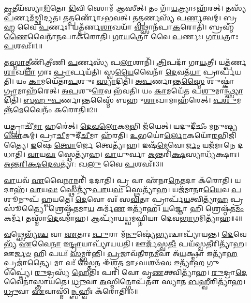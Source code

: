 \setcounter{anuvakam}{0}

\-\ul{𑌤𑍃}\-𑌤𑍀𑌯᳴𑌸𑍍𑌯𑌾\-\ul{𑌮𑌿}\-𑌤𑍋 \ul{𑌦𑌿}\-𑌵𑌿 𑌸𑍋𑌮᳴ 𑌆𑌸𑍀𑌤𑍍।
𑌤𑌂 𑌗𑌾᳴\-\ul{𑌯}\-𑌤𑍍𑌰𑍍𑌯𑌾\-𑌽𑌹᳴𑌰𑌤𑍍।
𑌤𑌸𑍍𑌯᳴ \ul{𑌪}\-𑌰𑍍𑌣𑌮᳴𑌚𑍍𑌛𑌿𑌦𑍍𑌯𑌤।
𑌤\-\ul{𑌤𑍍𑌪}\-𑌰𑍍𑌣𑍋᳴\-𑌽𑌭𑌵𑌤𑍍।
𑌤\-\ul{𑌤𑍍𑌪}\-𑌰𑍍𑌣𑌸𑍍𑌯᳴ 𑌪\-\ul{𑌰𑍍𑌣}\-𑌤𑍍𑌵𑌮𑍍।
𑌬𑍍𑌰\-\ul{𑌹𑍍𑌮} 𑌵𑍈 \ul{𑌪}\-𑌰𑍍𑌣𑌃।
𑌯𑌤𑍍𑌪᳴𑌰𑍍𑌣\-\ul{𑌶𑌾}\-𑌖𑌯𑌾᳴ \ul{𑌵}\-𑌥𑍍𑌸𑌾𑌨᳴𑌪𑌾\-\ul{𑌕}\-𑌰𑍋𑌤𑌿᳴।
𑌬𑍍𑌰𑌹𑍍𑌮᳴\-\ul{𑌣𑍈}\-𑌵𑍈𑌨𑌾᳴\-\ul{𑌨}\-𑌪𑌾𑌕᳴𑌰𑍋𑌤𑌿।
\-\ul{𑌗𑌾}\-\-\ul{𑌯}\-𑌤𑍍𑌰𑍋 𑌵𑍈 \ul{𑌪}\-𑌰𑍍𑌣𑌃।
\-\ul{𑌗𑌾}\-\-\ul{𑌯}\-𑌤𑍍𑌰𑌾𑌃 \ul{𑌪}\-𑌶𑌵𑌃᳴॥1॥

𑌤\-\ul{𑌸𑍍𑌮𑌾}\-𑌤𑍍𑌤𑍍𑌰𑍀𑌣𑌿᳴𑌤𑍍𑌰𑍀𑌣𑌿 \ul{𑌪}\-𑌰𑍍𑌣𑌸𑍍𑌯᳴ 𑌪\-\ul{𑌲𑌾}\-𑌶𑌾𑌨𑌿᳴।
\-\ul{𑌤𑍍𑌰𑌿}\-𑌪𑌦𑌾᳴ 𑌗𑌾\-\ul{𑌯}\-𑌤𑍍𑌰𑍀।
𑌯𑌤𑍍𑌪᳴𑌰𑍍𑌣\-\ul{𑌶𑌾}\-𑌖\-\ul{𑌯𑌾} 𑌗𑌾𑌃 \ul{𑌪𑍍𑌰𑌾}\-𑌰𑍍𑌪𑌯᳴𑌤𑌿।
𑌸𑍍𑌵\-\ul{𑌯𑍈}\-𑌵𑍈𑌨𑌾᳴ \ul{𑌦𑍇}\-𑌵𑌤᳴\-\ul{𑌯𑌾} 𑌪𑍍𑌰𑌾𑌰𑍍𑌪᳴𑌯𑌤𑌿।
𑌯𑌂 \ul{𑌕𑌾}\-𑌮𑌯𑍇᳴𑌤𑌾\-\ul{𑌪}\-𑌶𑍁𑌃 \ul{𑌸𑍍𑌯𑌾}\-𑌦𑌿𑌤𑌿᳴।
\-\ul{𑌅}\-\-\ul{𑌪}\-𑌰𑍍𑌣𑌾𑌨𑍍𑌤\-\ul{𑌸𑍍𑌮𑍈} 𑌶𑍁𑌷𑍍𑌕𑌾॑\-\ul{𑌗𑍍𑌰𑌾}\-𑌮𑌾𑌹᳴𑌰𑍇𑌤𑍍।
\-\ul{𑌅}\-\-\ul{𑌪}\-𑌶𑍁\-\ul{𑌰𑍇}\-𑌵 𑌭᳴𑌵𑌤𑌿।
𑌯𑌂 \ul{𑌕𑌾}\-𑌮𑌯𑍇᳴𑌤 𑌪\-\ul{𑌶𑍁}\-𑌮𑌾\-\ul{𑌨𑍍𑌥𑍍𑌸𑍍𑌯𑌾}\-𑌦𑌿𑌤𑌿᳴।
\-\ul{𑌬}\-\-\ul{𑌹𑍁}\-\-\ul{𑌪}\-𑌰𑍍𑌣𑌾𑌨𑍍𑌤𑌸𑍍𑌮𑍈᳴ 𑌬𑌹𑍁\-\ul{𑌶𑌾}\-𑌖𑌾𑌮𑌾𑌹᳴𑌰𑍇𑌤𑍍।
\-\ul{𑌪}\-\-\ul{𑌶𑍁}\-𑌮𑌨𑍍𑌤᳴\-\ul{𑌮𑍇}\-𑌵𑍈𑌨𑌂᳴ 𑌕𑌰𑍋𑌤𑌿॥2॥

𑌯𑌤𑍍𑌪𑍍𑌰𑌾𑌚𑍀᳴\-\ul{𑌮𑌾} 𑌹𑌰𑍇॑𑌤𑍍।
\-\ul{𑌦𑍇}\-\-\ul{𑌵}\-\-\ul{𑌲𑍋}\-𑌕\-\ul{𑌮}\-𑌭𑌿 𑌜᳴𑌯𑍇𑌤𑍍।
𑌯𑌦𑍁𑌦𑍀᳴𑌚𑍀𑌂 𑌮𑌨𑍁𑌷𑍍𑌯\-\ul{𑌲𑍋}\-𑌕𑌮𑍍।
𑌪𑍍𑌰𑌾\-\ul{𑌚𑍀}\-𑌮𑍁𑌦𑍀᳴\-\ul{𑌚𑍀}\-𑌮𑌾 𑌹᳴𑌰𑌤𑌿।
\-\ul{𑌉}\-𑌭𑌯𑍋॑\-\ul{𑌰𑍍𑌲𑍋}\-𑌕𑌯𑍋᳴\-\ul{𑌰}\-𑌭𑌿\-𑌜𑌿᳴𑌤𑍍𑌯𑍈।
\-\ul{𑌇}\-𑌷𑍇 \ul{𑌤𑍍𑌵𑍋}\-𑌰𑍍𑌜𑍇 𑌤𑍍𑌵𑍇𑌤𑍍𑌯𑌾᳴𑌹।
𑌇𑌷᳴\-\ul{𑌮𑍇}\-𑌵𑍋\-\ul{𑌰𑍍𑌜𑌂} 𑌯𑌜᳴𑌮𑌾𑌨𑍇 𑌦𑌧𑌾𑌤𑌿।
\-\ul{𑌵𑌾}\-𑌯\-\ul{𑌵𑌃} 𑌸𑍍𑌥𑍇𑌤𑍍𑌯𑌾᳴𑌹।
\-\ul{𑌵𑌾}\-𑌯𑍁𑌰𑍍𑌵𑌾 \ul{𑌅}\-𑌨𑍍𑌤𑌰𑌿᳴\-\ul{𑌕𑍍𑌷}\-𑌸𑍍𑌯𑌾𑌧𑍍𑌯᳴𑌕𑍍𑌷𑌾𑌃।
\-\ul{𑌅}\-\-\ul{𑌨𑍍𑌤}\-\-\ul{𑌰𑌿}\-\-\ul{𑌕𑍍𑌷}\-\-\ul{𑌦𑍇}\-\-\ul{𑌵}\-𑌤𑍍𑌯𑌾॑: 𑌖\-\ul{𑌲𑍁} 𑌵𑍈 \ul{𑌪}\-𑌶𑌵𑌃᳴॥3॥

\-\ul{𑌵𑌾}\-𑌯𑌵᳴ \ul{𑌏}\-𑌵𑍈\-\ul{𑌨𑌾}\-𑌨𑍍𑌪𑌰𑌿᳴ 𑌦𑌦𑌾𑌤𑌿।
𑌪𑍍𑌰 𑌵𑌾 𑌏᳴𑌨𑌾\-\ul{𑌨𑍇}\-𑌤𑌦𑌾 𑌕᳴𑌰𑍋𑌤𑌿।
𑌯𑌦𑌾𑌹᳴।
\-\ul{𑌵𑌾}\-𑌯\-\ul{𑌵𑌃} 𑌸𑍍𑌥𑍇𑌤𑍍𑌯𑍁᳴\-\ul{𑌪𑌾}\-𑌯\-\ul{𑌵𑌃} 𑌸𑍍𑌥𑍇𑌤𑍍𑌯𑌾᳴𑌹।
𑌯𑌜᳴𑌮𑌾𑌨𑌾\-\ul{𑌯𑍈}\-𑌵 \ul{𑌪}\-𑌶𑍂𑌨𑍁𑌪᳴ 𑌹𑍍𑌵𑌯𑌤𑍇।
\-\ul{𑌦𑍇}\-𑌵𑍋 𑌵𑌃᳴ 𑌸\-\ul{𑌵𑌿}\-𑌤𑌾 𑌪𑍍𑌰𑌾𑌰𑍍𑌪᳴\-\ul{𑌯}\-𑌤𑍍𑌵𑌿𑌤𑍍𑌯𑌾᳴\-\ul{𑌹} 𑌪𑍍𑌰𑌸𑍂॑𑌤𑍍𑌯𑍈।
𑌶𑍍𑌰𑍇𑌷𑍍𑌠᳴𑌤𑌮𑌾\-\ul{𑌯} 𑌕𑌰𑍍𑌮᳴\-\ul{𑌣} 𑌇𑌤𑍍𑌯𑌾᳴𑌹।
\-\ul{𑌯}\-𑌜𑍍𑌞𑍋 𑌹𑌿 𑌶𑍍𑌰𑍇𑌷𑍍𑌠᳴𑌤\-\ul{𑌮𑌂} 𑌕𑌰𑍍𑌮᳴।
𑌤𑌸𑍍𑌮𑌾᳴\-\ul{𑌦𑍇}\-𑌵𑌮𑌾᳴𑌹।
𑌆𑌪𑍍𑌯𑌾᳴𑌯𑌧𑍍𑌵𑌮𑌘𑍍𑌨𑌿𑌯𑌾 𑌦𑍇𑌵\-\ul{𑌭𑌾}\-𑌗𑌮𑌿𑌤𑍍𑌯𑌾᳴𑌹॥4॥

\-\ul{𑌵}\-𑌥𑍍𑌸𑍇𑌭𑍍𑌯᳴\-\ul{𑌶𑍍𑌚} 𑌵𑌾 \ul{𑌏}\-𑌤𑌾𑌃 \ul{𑌪𑍁}\-𑌰𑌾 𑌮᳴\-\ul{𑌨𑍁}\-𑌷𑍍𑌯𑍇॑\-\ul{𑌭𑍍𑌯}\-𑌶𑍍𑌚𑌾𑌪𑍍𑌯𑌾᳴𑌯𑌨𑍍𑌤।
\-\ul{𑌦𑍇}\-𑌵𑍇𑌭𑍍𑌯᳴ \ul{𑌏}\-𑌵𑍈\-\ul{𑌨𑌾} 𑌇\-\ul{𑌨𑍍𑌦𑍍𑌰𑌾}\-𑌯𑌾𑌪𑍍𑌯𑌾᳴𑌯𑌯𑌤𑌿।
𑌊𑌰𑍍𑌜᳴𑌸𑍍𑌵\-\ul{𑌤𑍀𑌃} 𑌪𑌯᳴𑌸𑍍𑌵\-\ul{𑌤𑍀}\-𑌰𑌿𑌤𑍍𑌯𑌾᳴𑌹।
𑌊\-\ul{𑌰𑍍𑌜}\-\-\ul{𑍞} 𑌹𑌿 𑌪𑌯𑌃᳴ \ul{𑌸}\-𑌮𑍍𑌭𑌰᳴𑌨𑍍𑌤𑌿।
\-\ul{𑌪𑍍𑌰}\-𑌜𑌾𑌵᳴𑌤𑍀𑌰𑌨\-\ul{𑌮𑍀}\-𑌵𑌾 𑌅᳴\-\ul{𑌯}\-𑌕𑍍𑌷𑍍𑌮𑌾 𑌇𑌤𑍍𑌯𑌾᳴\-\ul{𑌹} 𑌪𑍍𑌰𑌜𑌾॑𑌤𑍍𑌯𑍈।
𑌮𑌾 𑌵𑌃᳴ \ul{𑌸𑍍𑌤𑍇}\-𑌨 𑌈᳴𑌶\-\ul{𑌤} 𑌮𑌾𑌽𑌘𑌶𑍞᳴\-\ul{𑌸} 𑌇𑌤𑍍𑌯𑌾᳴\-\ul{𑌹} 𑌗𑍁𑌪𑍍𑌤𑍍𑌯𑍈॑।
\-\ul{𑌰𑍁}\-𑌦𑍍𑌰𑌸𑍍𑌯᳴ \ul{𑌹𑍇}\-𑌤𑌿𑌃 𑌪𑌰𑌿᳴ 𑌵𑍋 𑌵𑍃\-\ul{𑌣}\-𑌕𑍍𑌤𑍍𑌵𑌿𑌤𑍍𑌯𑌾᳴𑌹।
\-\ul{𑌰𑍁}\-𑌦𑍍𑌰𑌾\-\ul{𑌦𑍇}\-𑌵𑍈𑌨𑌾॑𑌸𑍍𑌤𑍍𑌰𑌾𑌯𑌤𑍇।
\-\ul{𑌧𑍍𑌰𑍁}\-𑌵𑌾 \ul{𑌅}\-𑌸𑍍𑌮𑌿𑌨𑍍𑌗𑍋𑌪᳴𑌤𑍗 𑌸𑍍𑌯𑌾𑌤 \ul{𑌬}\-𑌹𑍍𑌵𑍀𑌰𑌿𑌤𑍍𑌯𑌾᳴𑌹।
\-\ul{𑌧𑍍𑌰𑍁}\-𑌵𑌾 \ul{𑌏}\-𑌵𑌾𑌸𑍍𑌮𑌿᳴\-\ul{𑌨𑍍𑌬}\-𑌹𑍍𑌵𑍀𑌃 𑌕᳴𑌰𑍋𑌤𑌿॥5॥

